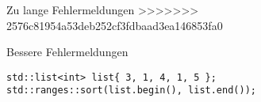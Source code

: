 \begin{frame}{Zu lange Fehlermeldungen}
>>>>>>> 2576c81954a53deb252cf3fdbaad3ea146853fa0

\end{frame}

\begin{frame}[fragile]{Bessere Fehlermeldungen}

    \begin{verbatim}
std::list<int> list{ 3, 1, 4, 1, 5 };
std::ranges::sort(list.begin(), list.end());
    \end{verbatim}
\end{frame}

